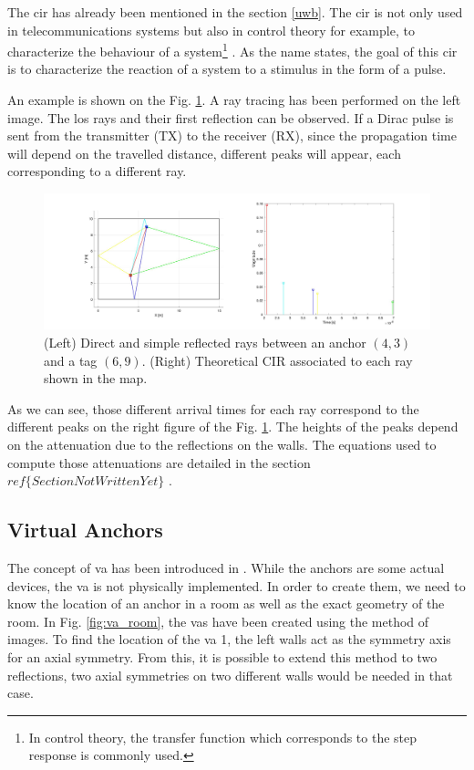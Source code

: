The \gls{cir} has already been mentioned in the section \ref{uwb}. The \gls{cir} is not only used in telecommunications systems but also in control theory for example, to characterize the behaviour of a system\footnote{In control theory, the transfer function which corresponds to the step response is commonly used.} \cite{garonne2019course}. As the name states, the goal of this \gls{cir} is to characterize the reaction of a system to a stimulus in the form of a pulse.
\vspace{2mm}

An example is shown on the Fig. \ref{fig:cir_ex1}. A ray tracing has been performed on the left image. The \gls{los} rays and their first reflection can be observed. If a Dirac pulse is sent from the transmitter (TX) to the receiver (RX), since the propagation time will depend on the travelled distance, different peaks will appear, each corresponding to a different ray.

\begin{figure}[H]
	\centering
	\includegraphics[width=1\linewidth]{Images/Anchor-mpc.jpg}
	\caption{(Left) Direct and simple reflected rays between an anchor $(4, 3)$ and a tag $(6, 9)$. (Right) Theoretical CIR associated to each ray shown in the map. 	\label{fig:cir_ex1}}

\end{figure}

As we can see, those different arrival times for each ray correspond to the different peaks on the right figure of the Fig. \ref{fig:cir_ex1}. The heights of the peaks depend on the attenuation due to the reflections on the walls. The equations used to compute those attenuations are detailed in the section \color{red} $ref\{SectionNotWrittenYet\}$ \color{black}. 

\subsection{Virtual Anchors}

The concept of \gls{va} has been introduced in  \cite{meissner2010uwb}. While the anchors are some actual devices, the \gls{va} is not physically implemented. In order to create them, we need to know the location of an anchor in a room as well as the exact geometry of the room. In Fig. \ref{fig:va_room}, the \glspl{va} have been created using the method of images. To find the location of the \gls{va} 1, the left walls act as the symmetry axis for an axial symmetry. From this, it is possible to extend this method to two reflections, two axial symmetries on two different walls would be needed in that case.

